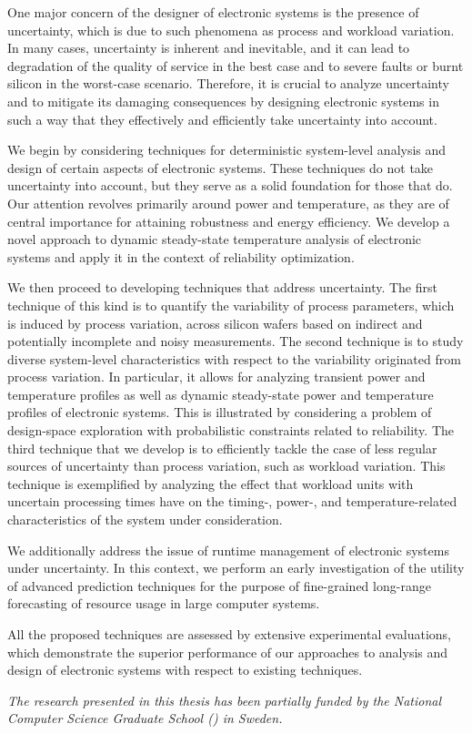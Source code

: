 One major concern of the designer of electronic systems is the presence of
uncertainty, which is due to such phenomena as process and workload variation.
In many cases, uncertainty is inherent and inevitable, and it can lead to
degradation of the quality of service in the best case and to severe faults or
burnt silicon in the worst-case scenario. Therefore, it is crucial to analyze
uncertainty and to mitigate its damaging consequences by designing electronic
systems in such a way that they effectively and efficiently take uncertainty
into account.

We begin by considering techniques for deterministic system-level analysis and
design of certain aspects of electronic systems. These techniques do not take
uncertainty into account, but they serve as a solid foundation for those that
do. Our attention revolves primarily around power and temperature, as they are
of central importance for attaining robustness and energy efficiency. We develop
a novel approach to dynamic steady-state temperature analysis of electronic
systems and apply it in the context of reliability optimization.

We then proceed to developing techniques that address uncertainty. The first
technique of this kind is to quantify the variability of process parameters,
which is induced by process variation, across silicon wafers based on indirect
and potentially incomplete and noisy measurements. The second technique is to
study diverse system-level characteristics with respect to the variability
originated from process variation. In particular, it allows for analyzing
transient power and temperature profiles as well as dynamic steady-state power
and temperature profiles of electronic systems. This is illustrated by
considering a problem of design-space exploration with probabilistic constraints
related to reliability. The third technique that we develop is to efficiently
tackle the case of less regular sources of uncertainty than process variation,
such as workload variation. This technique is exemplified by analyzing the
effect that workload units with uncertain processing times have on the timing-,
power-, and temperature-related characteristics of the system under
consideration.

We additionally address the issue of runtime management of electronic systems
under uncertainty. In this context, we perform an early investigation of the
utility of advanced prediction techniques for the purpose of fine-grained
long-range forecasting of resource usage in large computer systems.

All the proposed techniques are assessed by extensive experimental evaluations,
which demonstrate the superior performance of our approaches to analysis and
design of electronic systems with respect to existing techniques.

\vspace{1em}
\noindent
\emph{
  The research presented in this thesis has been partially funded by the
  National Computer Science Graduate School () in Sweden.
}
